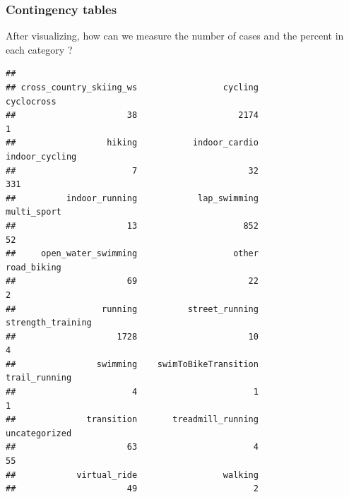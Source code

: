 \documentclass[
]{book}
\newenvironment{Shaded}{\begin{snugshade}}{\end{snugshade}}
\newcommand{\DecValTok}[1]{\textcolor[rgb]{0.00,0.00,0.81}{#1}}
\newcommand{\KeywordTok}[1]{\textcolor[rgb]{0.13,0.29,0.53}{\textbf{#1}}}
\newcommand{\NormalTok}[1]{#1}
\newcommand{\OperatorTok}[1]{\textcolor[rgb]{0.81,0.36,0.00}{\textbf{#1}}}
\newcommand{\StringTok}[1]{\textcolor[rgb]{0.31,0.60,0.02}{#1}}
\begin{document}
\hypertarget{contingency-tables}{%
\subsubsection{Contingency tables}\label{contingency-tables}}

After visualizing, how can we measure the number of cases and the percent in each category ?

\begin{Shaded}
\end{Shaded}

\begin{verbatim}
## 
## cross_country_skiing_ws                 cycling              cyclocross 
##                      38                    2174                       1 
##                  hiking           indoor_cardio          indoor_cycling 
##                       7                      32                     331 
##          indoor_running            lap_swimming             multi_sport 
##                      13                     852                      52 
##     open_water_swimming                   other             road_biking 
##                      69                      22                       2 
##                 running          street_running       strength_training 
##                    1728                      10                       4 
##                swimming    swimToBikeTransition           trail_running 
##                       4                       1                       1 
##              transition       treadmill_running           uncategorized 
##                      63                       4                      55 
##            virtual_ride                 walking 
##                      49                       2
\end{verbatim}

\begin{Shaded}
\end{Shaded}
\end{document}
